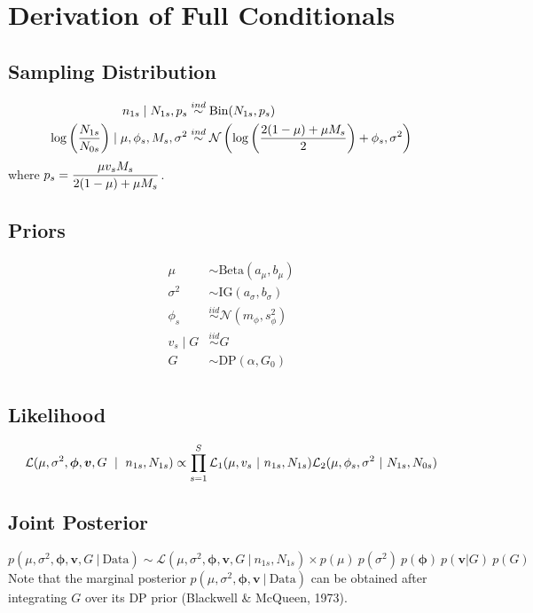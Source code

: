 \documentclass[12pt]{article}
\newcommand{\Binom}{\mbox{Bin}}
\newcommand{\iid}{\stackrel{iid}{\sim}}
\begin{document}
\section{Derivation of Full Conditionals}
\subsection{Sampling Distribution}

\begin{align*}
  n_{1s} \mid N_{1s}, p_{s} &\ind \Binom(N_{1s}, p_{s}) \\
  \log\p{\frac{N_{1s}}{N_{0s}}} \mid \mu, \phi_s, M_s, \sigma^2 &\ind \N\p{\log\p{\frac{2(1-\mu)+\mu M_s}{2}}+\phi_s, \sigma^2}\\
\end{align*}
where $p_s = \displaystyle\frac{\mu v_s M_s}{2(1-\mu)+\mu M_s}$.

\subsection{Priors}
\begin{align*}
\mu &\sim \text{Beta}(a_\mu,b_\mu)\\
\sigma^2 &\sim \text{IG}(a_\sigma,b_\sigma)\\
\phi_s &\iid \mathcal{N}(m_\phi,s^2_\phi) \\
v_s \mid G &\iid G \\
G &\sim \text{DP}(\alpha,G_0) \\
\end{align*}

\subsection{Likelihood}
$$
\mathcal{L}(\mu,\sigma^2,\bm{\phi},\bm{v},G~\mid~n_{1s},N_{1s}) \propto \displaystyle\prod_{s=1}^S \mathcal{L}_1(\mu,v_s~|~n_{1s},N_{1s})\mathcal{L}_2(\mu,\phi_s,\sigma^2~|~N_{1s},N_{0s})
$$

\subsection{Joint Posterior}
$$
p(\mu,\sigma^2, \bm\phi, \bm v, G ~|~ \text{Data}) \sim \mathcal{L}(\mu,\sigma^2,\bm\phi,\bm v,G~|~n_{1s},N_{1s}) \times p(\mu)~p(\sigma^2)~p(\bm\phi)~p(\bm v|G)~p(G)
$$
Note that the marginal posterior $p(\mu,\sigma^2, \bm\phi,\bm v ~|~ \text{Data})$ can be obtained after integrating $G$ over its DP prior (Blackwell \& McQueen, 1973).
\end{document}

